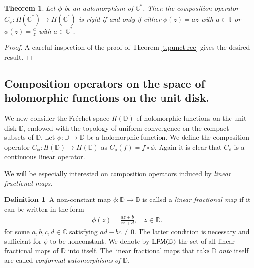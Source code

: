 \documentclass[12pt,leqno]{amsart}
\theoremstyle{plain}
\newtheorem{theorem}[equation]{Theorem}
\theoremstyle{definition}
\newtheorem{definition}[equation]{Definition}
\numberwithin{equation}{section}
\begin{document}
\begin{theorem}
	Let $\phi$ be an automorphism of ${\mathbb C}^*$. Then the composition operator $C_{\phi }: H({\mathbb C}^*) \to H({\mathbb C}^*)$ is rigid if and only if either $\phi (z)=az$ with $a\in \mathbb{T}$ or $\phi (z)=\frac{a}{z}$ with $a\in {\mathbb C}^*$. 
\end{theorem}

\begin{proof}
	A careful inspection of the proof of Theorem \ref{t.punct-rec} gives the desired result. 
\end{proof}

\subsection{Composition operators on the space of holomorphic functions on the unit disk.} We now consider the Fr\'echet space $H(\mathbb D)$ of holomorphic functions on the unit disk $\mathbb D$, endowed with the topology of uniform convergence on the compact subsets of $\mathbb D$. Let $\phi:\mathbb D\to \mathbb D$ be a holomorphic function. We define the composition operator $C_\phi:H(\mathbb D)\to H(\mathbb D)$ as $C_\phi(f)=f\circ \phi$. Again it is clear that $C_\phi$ is a continuous linear operator.

We will be especially interested on composition operators induced by \emph{linear fractional maps}.

\begin{definition}
	A non-constant map $\phi:\mathbb D\to \mathbb D$ is called a \emph {linear fractional map} if it can be written in the form 
	\begin{align*}
		\phi(z)=\frac{az+b}{cz+d},\quad z\in\mathbb D, 
	\end{align*}
	for some $a,b,c,d\in\mathbb C$ satisfying $ad-bc\neq 0$. The latter condition is necessary and sufficient for $\phi$ to be nonconstant. We denote by ${\textnormal{LFM} (\mathbb D)}$ the set of all linear fractional maps of $\mathbb D$ into itself. The linear fractional maps that take $\mathbb D$ \emph{onto} itself are called \emph{conformal automorphisms of $\mathbb D$}. 
\end{definition}
\end{document}
